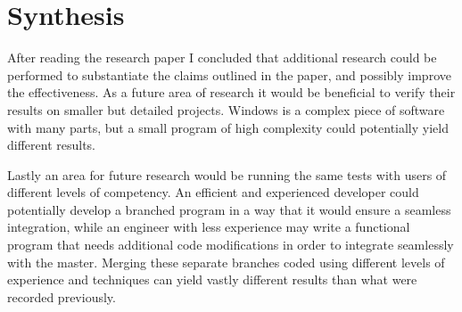 \documentclass[11pt]{article}
\begin{document}
\vspace*{-.1in}
\section{Synthesis}
\label{sec:synthesis}
\vspace*{-.1in}

After reading the research paper I concluded that additional research could be performed to substantiate the claims outlined in the paper, and possibly improve the effectiveness. As a future area of research it would be beneficial to verify their results on smaller  but detailed projects. Windows is a complex piece of software with many parts, but a small program of high complexity could potentially yield different results.

Lastly an area for future research would be running the same tests with users of different levels of competency. An efficient and experienced developer could potentially develop a branched program in a way that it would ensure a seamless integration, while an engineer with less experience may write a functional program that needs additional code modifications in order to integrate seamlessly with the master. Merging these separate branches coded using different levels of experience and techniques can yield vastly different results than what were recorded previously.



\end{document}
